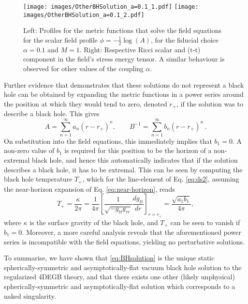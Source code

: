 \documentclass[reprint,amsmath,amssymbGaps,onecolumn,notitlepage,nofootinbib]{revtex4-1}
\newcommand{\sbr}[1]{\left[#1\right]}
\begin{document}
\begin{figure}[ht!]
\centering
\texttt{[image: images/OtherBHSolution\_a=0.1\_1.pdf]}\hfill
\texttt{[image: images/OtherBHSolution\_a=0.1\_2.pdf]}
\caption{Left: Profiles for the metric functions that solve the field equations for the scalar field profile $\phi = -\frac{1}{2} \log(A)$, for the fiducial choice $\alpha=0.1$ and $M=1$. Right: Respective Ricci scalar and (t-t) component in the field's stress energy tensor. A similar behaviour is observed for other values of the coupling $\alpha$.}
\label{fig:OtherSolution}
\end{figure}

\par Further evidence that demonstrates that these solutions do not represent a black hole can be obtained by expanding the metric functions in a power series around the position at which they would tend to zero, denoted $r_+$, if the solution was to describe a black hole. This gives
\begin{equation}
A = \sum_{n=1}^{\infty} a_{n} (r-r_+)^n, \qquad B^{-1} = \sum_{n=1}^{\infty} b_{n} (r-r_+)^n\,.
\label{eq:near-horizon}
\end{equation}
On substitution into the field equations, this immediately implies that $b_1 = 0$. A non-zero value of $b_1$ 
is required for this position to be the horizon of a non-extremal black hole, and hence this automatically indicates that if the solution describes a black hole, it has to be extremal. This can be seen by computing the black hole temperature $T_+$, which for the line-element of Eq. \eqref{eq:ds2}, assuming the near-horizon expansion of Eq. \eqref{eq:near-horizon}, reads \cite{Gibbons:1994ff,PhysRevD.15.2752}
\begin{equation}
    T_+ = \frac{\kappa}{2\pi} = \frac{1}{4\pi} \sbr{\frac{1}{\sqrt{-g_{tt}g_{rr}}} \frac{dg_{tt}}{dr}}_{r=r_+} = \frac{\sqrt{a_1 b_1}}{4\pi},
\end{equation}
where $\kappa$ is the surface gravity of the black hole, and $T_+$ can be seen to vanish if $b_1=0$. Moreover, a more careful analysis reveals that the aforementioned power series is incompatible with the field equations, yielding no perturbative solutions.

To summarise, we have shown that \eqref{eq:BHsolution} is the unique static spherically-symmetric and asymptotically-flat vacuum black hole solution to the regularized 4DEGB theory, and that there exists one other (likely unphysical) spherically-symmetric and asymptotically-flat solution which corresponds to a naked singularity. 
\end{document}

